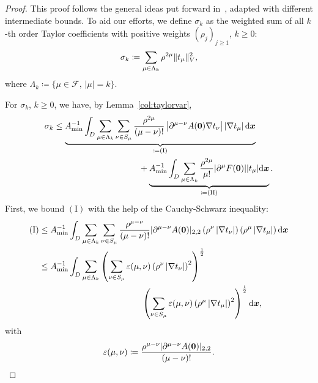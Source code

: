 \begin{proof}
	This proof follows the general ideas put forward in~\cite{bachmayr2017}, adapted with different intermediate bounds.
	To aid our efforts, we define $\sigma_k$ as the weighted sum of all $k$-th order Taylor coefficients with positive weights $(\rho_j)_{j\geq 1}$, $k \geq 0$:
	\begin{align}
		\sigma_k \coloneqq \sum_{\mu \in \Lambda_k} \rho^{2\mu} \|t_\mu\|_{{V}}^2,
	\end{align}
	where $\Lambda_k\coloneqq\{\mu\in\mathcal{F}, \, |\mu| = k\}$.

	For $\sigma_k$, $k \geq 0$, we have, by Lemma~\ref{col:taylorvar},
	\begin{align}
		\sigma_k &\leq \underbrace{ A_{\min}^{-1} \int_{{D}} \sum_{\mu \in \Lambda_k} \sum_{\nu \in S_\mu}     \frac{\rho^{2\mu}}{(\mu - \nu)!} \left|\partial^{\mu-\nu}{A}(\bm{0}) \nabla  t_\nu \right|   \left|\nabla t_\mu\right| \mathrm{d}{{\bm{x}}}}_{\coloneqq(\text{I})}   \nonumber\\&\qquad\qquad\qquad\qquad\qquad+ \underbrace{A_{\min}^{-1} \int_{{D}} \sum_{\mu \in \Lambda_k}  \frac{\rho^{2\mu}}{\mu!} |\partial^\mu {F}(\bm{0})||t_\mu| \mathrm{d}{{\bm{x}}}}_{\coloneqq(\text{II})}.   \nonumber
	\end{align}
	First, we bound $(\text{I})$ with the help of the Cauchy-Schwarz inequality:
	\begin{align}
	(\text{I})%
		&\leq A_{\min}^{-1} \int_{{D}} \sum_{\mu \in \Lambda_k}\sum_{\nu \in S_\mu}     \frac{\rho^{\mu - \nu}}{(\mu - \nu)!} |\A|_{2,2} \left( \rho^\nu\abs{\nabla  t_\nu} \right) \left( \rho^\mu \abs{\nabla t_\mu}\right) \dx \nonumber\\
		&\leq A_{\min}^{-1} \int_{{D}} \sum_{\mu \in \Lambda_k} \left(\sum_{\nu \in S_\mu}   \varepsilon(\mu, \nu)  \left( \rho^\nu\abs{\nabla  t_\nu}\right) ^2\right)^{\frac{1}{2 }} \\&\qquad\qquad\qquad\qquad\qquad\qquad \left(\sum_{\nu \in S_\mu}    \varepsilon(\mu, \nu)  \left(\rho^\mu \abs{\nabla t_\mu}\right)^2\right)^{\frac{1}{2 }} \dx, \label{eq:firstCS}
	\end{align}
	with
	\begin{equation*}
		\varepsilon(\mu, \nu) \coloneqq \frac{\rho^{\mu - \nu}|\partial^{\mu-\nu}{A}(\bm{0})|_{2,2}}{ (\mu - \nu)!}.
	\end{equation*}

\end{proof}
